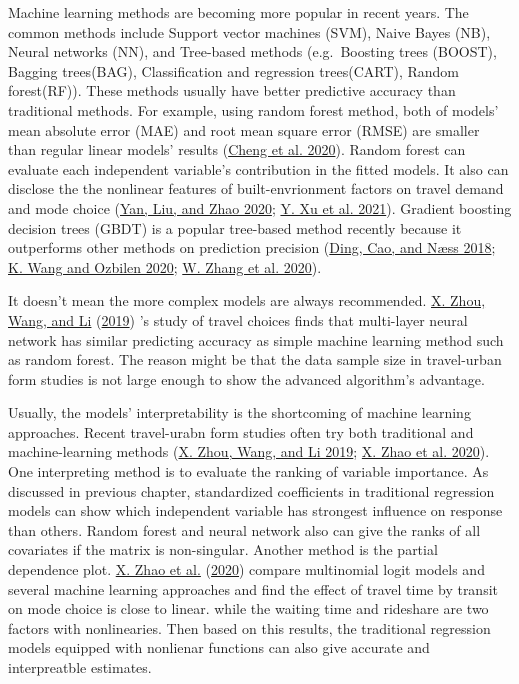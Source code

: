 \documentclass[
  11pt,
  openany]{memoir}
\begin{document}
Machine learning methods are becoming more popular in recent years.
The common methods include Support vector machines (SVM), Naive Bayes (NB), Neural networks (NN), and Tree-based methods (e.g.~Boosting trees (BOOST), Bagging trees(BAG), Classification and regression trees(CART), Random forest(RF)).
These methods usually have better predictive accuracy than traditional methods.
For example, using random forest method, both of models' mean absolute error (MAE) and root mean square error (RMSE) are smaller than regular linear models' results (\protect\hyperlink{ref-chengExaminingNonlinearBuilt2020}{Cheng et al. 2020}).
Random forest can evaluate each independent variable's contribution in the fitted models. It also can disclose the the nonlinear features of built-envrionment factors on travel demand and mode choice (\protect\hyperlink{ref-yanUsingMachineLearning2020}{Yan, Liu, and Zhao 2020}; \protect\hyperlink{ref-xuIdentifyingKeyFactors2021}{Y. Xu et al. 2021}).
Gradient boosting decision trees (GBDT) is a popular tree-based method recently because it outperforms other methods on prediction precision (\protect\hyperlink{ref-dingApplyingGradientBoosting2018}{Ding, Cao, and Næss 2018}; \protect\hyperlink{ref-wangSynergisticThresholdEffects2020}{K. Wang and Ozbilen 2020}; \protect\hyperlink{ref-zhangNonlinearEffectAccessibility2020}{W. Zhang et al. 2020}).

It doesn't mean the more complex models are always recommended.
\protect\hyperlink{ref-zhouBikesharingTaxiModeling2019}{X. Zhou, Wang, and Li} (\protect\hyperlink{ref-zhouBikesharingTaxiModeling2019}{2019}) 's study of travel choices finds that multi-layer neural network has similar predicting accuracy as simple machine learning method such as random forest. The reason might be that the data sample size in travel-urban form studies is not large enough to show the advanced algorithm's advantage.

Usually, the models' interpretability is the shortcoming of machine learning approaches.
Recent travel-urabn form studies often try both traditional and machine-learning methods (\protect\hyperlink{ref-zhouBikesharingTaxiModeling2019}{X. Zhou, Wang, and Li 2019}; \protect\hyperlink{ref-zhaoPredictionBehavioralAnalysis2020}{X. Zhao et al. 2020}).
One interpreting method is to evaluate the ranking of variable importance. As discussed in previous chapter, standardized coefficients in traditional regression models can show which independent variable has strongest influence on response than others. Random forest and neural network also can give the ranks of all covariates if the matrix is non-singular.
Another method is the partial dependence plot.
\protect\hyperlink{ref-zhaoPredictionBehavioralAnalysis2020}{X. Zhao et al.} (\protect\hyperlink{ref-zhaoPredictionBehavioralAnalysis2020}{2020}) compare multinomial logit models and several machine learning approaches and find the effect of travel time by transit on mode choice is close to linear. while the waiting time and rideshare are two factors with nonlinearies. Then based on this results, the traditional regression models equipped with nonlienar functions can also give accurate and interpreatble estimates.
\end{document}
